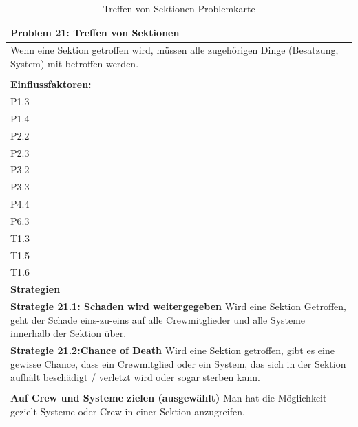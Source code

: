 \documentclass[fontsize=12pt,paper=a4,twoside]{scrartcl}
\begin{document}
\begin{table}[H]
    \centering
    \begin{tabular}{|p{15cm}|}
    \hline
          \textbf{Problem 21: Treffen von Sektionen}  \\ \hline
	Wenn eine Sektion getroffen wird, müssen alle zugehörigen Dinge (Besatzung, System) mit betroffen werden. \\
         \\ \hline
          \textbf{Einflussfaktoren: } \\
	P1.3\\
	P1.4 \\
	P2.2 \\
	P2.3 \\
	P3.2 \\
	P3.3 \\
	P4.4 \\
	P6.3 \\
	T1.3 \\
	T1.5 \\
	T1.6 \\
          \hline
          \textbf{Strategien} \\ \hline
            {}          
           \label{strategie:21.1}     
          \textbf{Strategie 21.1: Schaden wird weitergegeben} Wird eine Sektion Getroffen, geht der Schade eins-zu-eins auf alle Crewmitglieder und alle Systeme innerhalb der Sektion über.  \\        
  {}          
           \label{strategie:21.2}              
          \textbf{Strategie 21.2:Chance of Death} Wird eine Sektion getroffen, gibt es eine gewisse Chance, dass ein Crewmitglied oder ein System, das sich in der Sektion aufhält beschädigt / verletzt wird oder sogar sterben kann.  \\
	 \\ \hline
	 {}
	 \label{strategie:22.3}
	 \textbf{Auf Crew und Systeme zielen (ausgewählt)} Man hat die Möglichkeit gezielt Systeme oder Crew in einer Sektion anzugreifen.
    \end{tabular}

    \caption{Treffen von Sektionen Problemkarte}
    \label{tab:ProblemKarte21}
\end{table}
\end{document}
